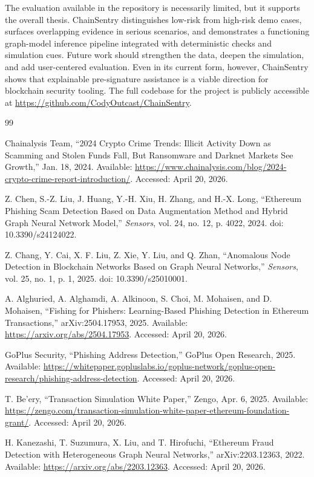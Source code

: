 \documentclass[11pt]{article}
\begin{document}
The evaluation available in the repository is necessarily limited, but it supports the overall thesis. ChainSentry distinguishes low-risk from high-risk demo cases, surfaces overlapping evidence in serious scenarios, and demonstrates a functioning graph-model inference pipeline integrated with deterministic checks and simulation cues. Future work should strengthen the data, deepen the simulation, and add user-centered evaluation. Even in its current form, however, ChainSentry shows that explainable pre-signature assistance is a viable direction for blockchain security tooling. The full codebase for the project is publicly accessible at \url{https://github.com/CodyOutcast/ChainSentry}.

\begin{thebibliography}{99}

Chainalysis Team, ``2024 Crypto Crime Trends: Illicit Activity Down as Scamming and Stolen Funds Fall, But Ransomware and Darknet Markets See Growth,'' Jan. 18, 2024. Available: \url{https://www.chainalysis.com/blog/2024-crypto-crime-report-introduction/}. Accessed: April 20, 2026.

Z. Chen, S.-Z. Liu, J. Huang, Y.-H. Xiu, H. Zhang, and H.-X. Long, ``Ethereum Phishing Scam Detection Based on Data Augmentation Method and Hybrid Graph Neural Network Model,'' \emph{Sensors}, vol. 24, no. 12, p. 4022, 2024. doi: 10.3390/s24124022.

Z. Chang, Y. Cai, X. F. Liu, Z. Xie, Y. Liu, and Q. Zhan, ``Anomalous Node Detection in Blockchain Networks Based on Graph Neural Networks,'' \emph{Sensors}, vol. 25, no. 1, p. 1, 2025. doi: 10.3390/s25010001.

A. Alghuried, A. Alghamdi, A. Alkinoon, S. Choi, M. Mohaisen, and D. Mohaisen, ``Fishing for Phishers: Learning-Based Phishing Detection in Ethereum Transactions,'' arXiv:2504.17953, 2025. Available: \url{https://arxiv.org/abs/2504.17953}. Accessed: April 20, 2026.

GoPlus Security, ``Phishing Address Detection,'' GoPlus Open Research, 2025. Available: \url{https://whitepaper.gopluslabs.io/goplus-network/goplus-open-research/phishing-address-detection}. Accessed: April 20, 2026.

T. Be'ery, ``Transaction Simulation White Paper,'' Zengo, Apr. 6, 2025. Available: \url{https://zengo.com/transaction-simulation-white-paper-ethereum-foundation-grant/}. Accessed: April 20, 2026.

H. Kanezashi, T. Suzumura, X. Liu, and T. Hirofuchi, ``Ethereum Fraud Detection with Heterogeneous Graph Neural Networks,'' arXiv:2203.12363, 2022. Available: \url{https://arxiv.org/abs/2203.12363}. Accessed: April 20, 2026.

\end{thebibliography}
\end{document}
